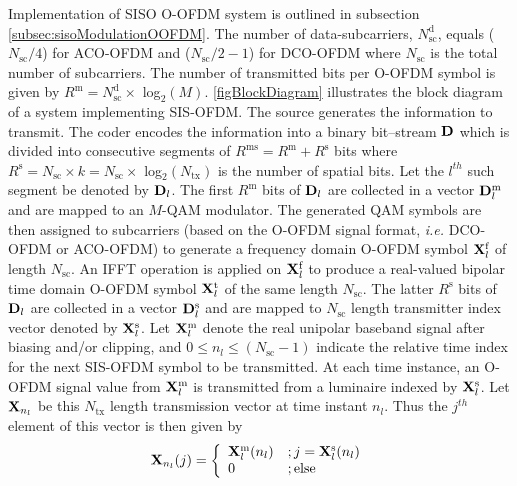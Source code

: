 Implementation of SISO O-OFDM system is outlined in subsection \ref{subsec:sisoModulationOOFDM}. The number of data-subcarriers, $N_{\text{sc}}^{\text{d}}$, equals ($N_{\text{sc}}/4$) for ACO-OFDM and ($N_{\text{sc}}/2-1$) for DCO-OFDM where $N_{\text{sc}}$ is the total number of subcarriers. The number of transmitted bits per O-OFDM symbol is given by $R^{\text{m}}=N_{\text{sc}}^{\text{d}}\times $ log$^{ }_{2}(M)$. \figurename{\ref{figBlockDiagram}} illustrates the block diagram of a system implementing SIS-OFDM. The source generates the information to transmit. The coder encodes the information into a binary bit--stream ${\bf{D}}$ which is divided into consecutive segments of $R^{\text{ms}}=R^{\text{m}}+R^{\text{s}}$ bits where $R^{\text{s}}=N_{\text{sc}}\times k=N_{\text{sc}}\times $ log$^{ }_{2}(N_{\text{tx}})$ is the number of spatial bits. Let the $l^{th}$ such segment be denoted by ${\bf{D}}_l$. The first $R^{\text{m}}$ bits of ${\bf{D}}_l$ are collected in a vector ${\bf{D}}_l^{\text{m}}$ and are mapped to an $M$-QAM modulator. The generated QAM symbols are then assigned to subcarriers (based on the O-OFDM signal format, \textit{i.e.} DCO-OFDM or ACO-OFDM) to generate a frequency domain O-OFDM symbol ${\bf{X}}_l^{\text{f}}$ of length $N_{\text{sc}}$. An IFFT operation is applied on ${\bf{X}}_l^{\text{f}}$ to produce a real-valued bipolar time domain O-OFDM symbol ${\bf{X}}_l^{\text{t}}$ of the same length $N_{\text{sc}}$. The latter $R^{\text{s}}$ bits of ${\bf{D}}_l$ are collected in a vector ${\bf{D}}_{l}^{\text{s}}$ and are mapped to $N_{\text{sc}}$ length transmitter index vector denoted by ${\bf{X}}_l^{\text{s}}$. Let ${\bf{X}}_l^{\text{m}}$ denote the real unipolar baseband signal after biasing and/or clipping, and $0\leq n_l\leq (N_{\text{sc}}-1)$ indicate the relative time index for the next SIS-OFDM symbol to be transmitted. At each time instance, an O-OFDM signal value from ${\bf{X}}_l^{\text{m}}$ is transmitted from a luminaire indexed by ${\bf{X}}_l^{\text{s}}$. Let ${\bf{X}}_{n_l}$ be this $N_{\text{tx}}$ length transmission vector at time instant $n_l$. Thus the $j^{th}$ element of this vector is then given by
\begin{equation}
	\label{eqX}
	{\bf{X}}_{n_l}(j) = \left\{ \begin{array}{ll} {\bf{X}}_l^{\text{m}}(n_l) &; j={\bf{X}}_l^{\text{s}}(n_l) \\ 0 &; \text{else} \end{array} \right.
\end{equation}


